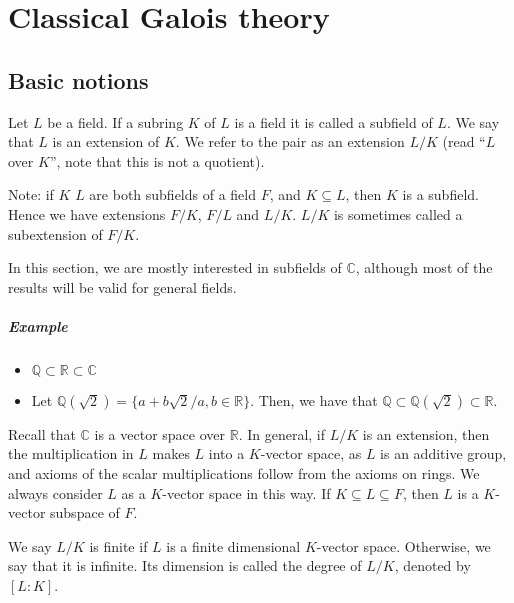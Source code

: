 \chapter{Classical Galois theory}
\section{Basic notions}
\begin{definition} \label{def:1}
  Let $L$ be a field. If a subring $K$ of $L$ is a field it is called a subfield of $L$. We say that $L$ is an extension of $K$. We refer to the pair as an extension $L/K$ (read ``$L$ over $K$'', note that this is not a quotient).
\end{definition}

Note: if $K$ $L$ are both subfields of a field $F$, and $K \subseteq L$, then $K$ is a subfield. Hence we have extensions $F/K$, $F/L$ and $L/K$. $L/K$ is sometimes called a subextension of $F/K$. 

In this section, we are mostly interested in subfields of $\mathbb{C}$, although most of the results will be valid for general fields.

\paragraph{Example}
\begin{itemize}
  \item $\mathbb{Q}\subset\mathbb{R}\subset\mathbb{C}$
  \item Let $\mathbb{Q}(\sqrt{2}) = \{ a + b\sqrt{2} / a, b \in \mathbb{R} \}$. Then, we have that $\mathbb{Q} \subset \mathbb{Q}(\sqrt{2}) \subset \mathbb{R}$.
\end{itemize}


Recall that $\mathbb{C}$ is a vector space over $\mathbb{R}$. In general, if $L/K$ is an extension, then the multiplication in $L$ makes $L$ into a $K$-vector space, as $L$ is an additive group, and axioms of the scalar multiplications follow from the axioms on rings. We always consider $L$ as a $K$-vector space in this way. If $K \subseteq L \subseteq F$, then $L$ is a $K$-vector subspace of $F$.

\begin{definition} \label{def:2}
  We say $L/K$ is finite if $L$ is a finite dimensional $K$-vector space. Otherwise, we say that it is infinite. Its dimension is called the degree of $L/K$, denoted by $[L : K]$.
\end{definition}

